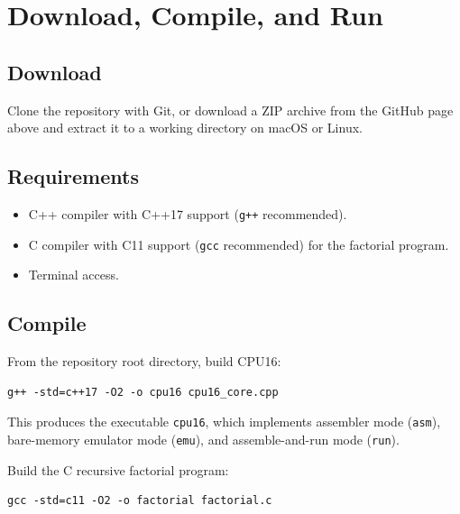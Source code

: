 \documentclass[12pt]{article}
\begin{document}
\section*{Download, Compile, and Run}

\subsection*{Download}

\noindent
Clone the repository with Git, or download a ZIP archive from the GitHub page above and extract it to a working directory on macOS or Linux.

\subsection*{Requirements}

\begin{itemize}
  \item C++ compiler with C++17 support (\texttt{g++} recommended).
  \item C compiler with C11 support (\texttt{gcc} recommended) for the factorial program.
  \item Terminal access.
\end{itemize}

\subsection*{Compile}

\noindent
From the repository root directory, build CPU16:

\begin{verbatim}
g++ -std=c++17 -O2 -o cpu16 cpu16_core.cpp
\end{verbatim}

\noindent
This produces the executable \texttt{cpu16}, which implements assembler mode (\texttt{asm}), bare-memory emulator mode (\texttt{emu}), and assemble-and-run mode (\texttt{run}).

\vspace{0.35in}

\noindent
Build the C recursive factorial program:

\begin{verbatim}
gcc -std=c11 -O2 -o factorial factorial.c
\end{verbatim}
\end{document}
